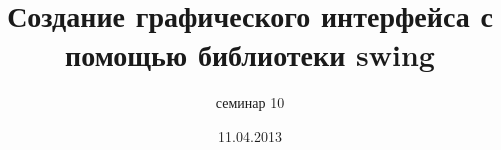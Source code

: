 \documentclass[hyperref={unicode,colorlinks=true,urlbordercolor=blue,linkcolor=blue,urlcolor=blue,pdfborderstyle={/S/U/W 1}}]{beamer}
\title{Создание графического интерфейса с помощью библиотеки swing}
\subtitle{семинар 10}
\date{11.04.2013}
\begin{document}
\frame{\titlepage}


\end{document}
